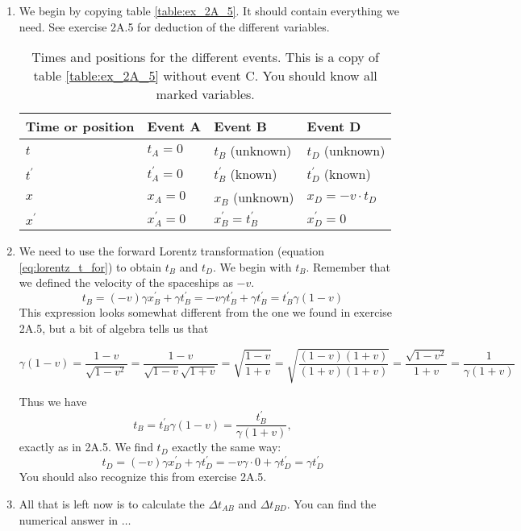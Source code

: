 \documentclass[a4paper,10pt,english]{article}
\begin{document}
\begin{enumerate}
\item We begin by copying table \ref{table:ex_2A_5}. It should contain everything we need. See exercise 2A.5 for deduction of the different variables.

\begin{table}[H]
  \begin{center}
    \begin{tabular}{| l | l | l | l |}
   	\hline
	 Time or position & Event A & Event B & Event D\\ \hline
	 $t$ & $t_{A}=0$ & $t_{B}$ (unknown) & $t_{D}$ (unknown) \\ \hline
	 $t^{\prime}$ & $t^{\prime}_{A}=0$ & $t_{B}^{\prime}$ (known) & $t^{\prime}_{D}$ (known) \\ \hline
	 $x$ & $x_{A}=0$ & $x_{B}$ (unknown) & $x_{D}=-v\cdot t_{D}$\\ \hline
	 $x^{\prime}$ & $x^{\prime}_{A}=0$ & $x_{B}^{\prime}=t_{B}^{\prime}$ & $x^{\prime}_{D}=0$\\ \hline
	\end{tabular}
    \caption{Times and positions for the different events. This is a copy of table \ref{table:ex_2A_5} without event C. You should know all marked variables.}
    \label{table:ex_2A_7}
  \end{center}
\end{table}
\FloatBarrier

\item %
We need to use the forward Lorentz transformation (equation \ref{eq:lorentz_t_for}) to obtain $t_{B}$ and $t_{D}$. We begin with $t_{B}$. Remember that we defined the velocity of the spaceships as $-v$.
\[
t_{B}=(-v)\gamma x^{\prime}_{B}+\gamma t^{\prime}_{B}=-v\gamma t_{B}^{\prime}+\gamma t_{B}^{\prime}=t_{B}^{\prime}\gamma(1-v)
\]
This expression looks somewhat different from the one we found in exercise 2A.5, but a bit of algebra tells us that

\begin{equation*}
\gamma(1-v)=\frac{1-v}{\sqrt{1-v^{2}}}=\frac{1-v}{\sqrt{1-v}\sqrt{1+v}}=\sqrt{\frac{1-v}{1+v}}=\sqrt{\frac{(1-v)(1+v)}{(1+v)(1+v)}}=\frac{\sqrt{1-v^{2}}}{1+v}=\frac{1}{\gamma(1+v)}
\end{equation*}

Thus we have 
\[
t_{B}=t_{B}^{\prime}\gamma(1-v)=\frac{t_{B}^{\prime}}{\gamma(1+v)},
\]
exactly as in 2A.5. We find $t_{D}$ exactly the same way:
\[
t_{D}=(-v)\gamma x^{\prime}_{D}+\gamma t^{\prime}_{D}=-v\gamma\cdot0+\gamma t^{\prime}_{D}=\gamma t^{\prime}_{D}
\]
You should also recognize this from exercise 2A.5.
\item All that is left now is to calculate the $\Delta t_{AB}$ and $\Delta t_{BD}$. You can find the numerical answer in $\ldots$
\end{enumerate}
%
%
%
%
%
%
%
%
\end{document}
